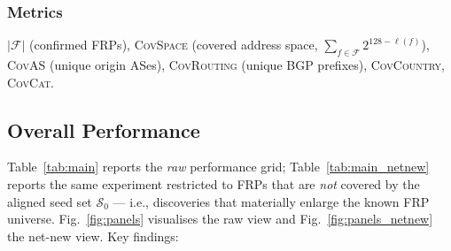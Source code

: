 \documentclass[conference]{IEEEtran}
\begin{document}
\subsubsection{Metrics}
$|\mathcal{F}|$ (confirmed FRPs),
\textsc{CovSpace} (covered address space,
$\sum_{f\in\mathcal{F}}2^{128-\ell(f)}$),
\textsc{CovAS} (unique origin ASes),
\textsc{CovRouting} (unique BGP prefixes),
\textsc{CovCountry}, \textsc{CovCat}.

\subsection{Overall Performance}\label{sec:eval:perf}

Table~\ref{tab:main} reports the \emph{raw} performance grid;
Table~\ref{tab:main_netnew} reports the same experiment
restricted to FRPs that are \emph{not} covered by the aligned
seed set $\mathcal{S}_{0}$ --- i.e., discoveries that materially
enlarge the known FRP universe.  Fig.~\ref{fig:panels}
visualises the raw view and Fig.~\ref{fig:panels_netnew} the
net-new view.  Key findings:
\end{document}
